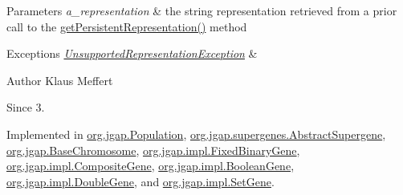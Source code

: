\begin{DoxyParams}{Parameters}
{\em a\-\_\-representation} & the string representation retrieved from a prior call to the \hyperlink{interfaceorg_1_1jgap_1_1_i_persistent_representation_a07bf7dbaa8de08e268c9357a46e79dac}{get\-Persistent\-Representation()} method\\
\hline
\end{DoxyParams}

\begin{DoxyExceptions}{Exceptions}
{\em \hyperlink{classorg_1_1jgap_1_1_unsupported_representation_exception}{Unsupported\-Representation\-Exception}} & \\
\hline
\end{DoxyExceptions}
\begin{DoxyAuthor}{Author}
Klaus Meffert 
\end{DoxyAuthor}
\begin{DoxySince}{Since}
3. 
\end{DoxySince}


Implemented in \hyperlink{classorg_1_1jgap_1_1_population_a5cb0aa594a5d3d089ea0cadbe9a002e8}{org.\-jgap.\-Population}, \hyperlink{classorg_1_1jgap_1_1supergenes_1_1_abstract_supergene_af8156c2a8b41bc9fe3e397595c513a6d}{org.\-jgap.\-supergenes.\-Abstract\-Supergene}, \hyperlink{classorg_1_1jgap_1_1_base_chromosome_a30276dc8afb0bd632c288bf7d2e18b55}{org.\-jgap.\-Base\-Chromosome}, \hyperlink{classorg_1_1jgap_1_1impl_1_1_fixed_binary_gene_a1b079182739f988716e7bcb26664a77f}{org.\-jgap.\-impl.\-Fixed\-Binary\-Gene}, \hyperlink{classorg_1_1jgap_1_1impl_1_1_composite_gene_abd62d1ccb9e0753b93d11a89fd055d0e}{org.\-jgap.\-impl.\-Composite\-Gene}, \hyperlink{classorg_1_1jgap_1_1impl_1_1_boolean_gene_a67b5e436592a8e9fa9e17a3794ec6deb}{org.\-jgap.\-impl.\-Boolean\-Gene}, \hyperlink{classorg_1_1jgap_1_1impl_1_1_double_gene_a9b71158d4e12d38732f9b60bf2ba1949}{org.\-jgap.\-impl.\-Double\-Gene}, and \hyperlink{classorg_1_1jgap_1_1impl_1_1_set_gene_aa2cb5e988d106f535d0c0a1e156d3dbc}{org.\-jgap.\-impl.\-Set\-Gene}.




